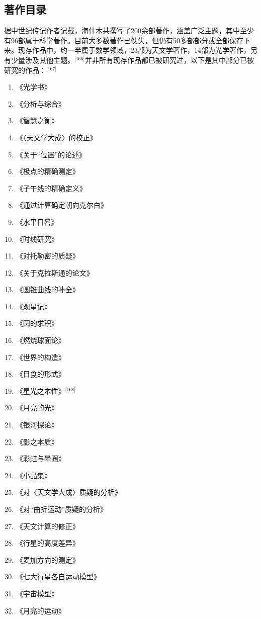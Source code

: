 \subsection{著作目录}
据中世纪传记作者记载，海什木共撰写了200余部著作，涵盖广泛主题，其中至少有96部属于科学著作。目前大多数著作已佚失，但仍有50多部部分或全部保存下来。现存作品中，约一半属于数学领域，23部为天文学著作，14部为光学著作，另有少量涉及其他主题。\(^\text{[166]}\)并非所有现存作品都已被研究过，以下是其中部分已被研究的作品：\(^\text{[167]}\)
\begin{enumerate}
\item 《光学书》
\item 《分析与综合》
\item 《智慧之衡》
\item 《〈天文学大成〉的校正》
\item 《关于“位置”的论述》
\item 《极点的精确测定》
\item 《子午线的精确定义》
\item 《通过计算确定朝向克尔白》
\item 《水平日晷》
\item 《时线研究》
\item 《对托勒密的质疑》
\item 《关于克拉斯通的论文》
\item 《圆锥曲线的补全》
\item 《观星记》
\item 《圆的求积》
\item 《燃烧球面论》
\item 《世界的构造》
\item 《日食的形式》
\item 《星光之本性》\(^\text{[168]}\)
\item 《月亮的光》
\item 《银河探论》
\item 《影之本质》
\item 《彩虹与晕圈》
\item 《小品集》
\item 《对〈天文学大成〉质疑的分析》
\item 《对“曲折运动”质疑的分析》
\item 《天文计算的修正》
\item 《行星的高度差异》
\item 《麦加方向的测定》
\item 《七大行星各自运动模型》
\item 《宇宙模型》
\item 《月亮的运动》

\end{enumerate}

